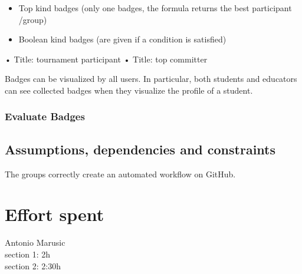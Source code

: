 \documentclass{article}
\newcommand{\participant}{participant }
\newcommand{\groups}{groups }
\begin{document}
                \begin{itemize}
                    \item Top kind badges (only one badges, the formula returns the best \participant /group)
                    \item Boolean kind badges (are given if a condition is satisfied)
                \end {itemize}

            
                • Title: tournament participant
                • Title: top committer


                Badges can be visualized by all users. In particular, both students and educators can see collected badges when they visualize the profile of a student.
            
            \subsubsection{Evaluate Badges}


    \subsection{Assumptions, dependencies and constraints}
        The \groups correctly create an automated workflow on GitHub.


\section{Effort spent}
    Antonio Marusic\\
    section 1: 2h\\
    section 2: 2:30h\\
    
\end{document}
